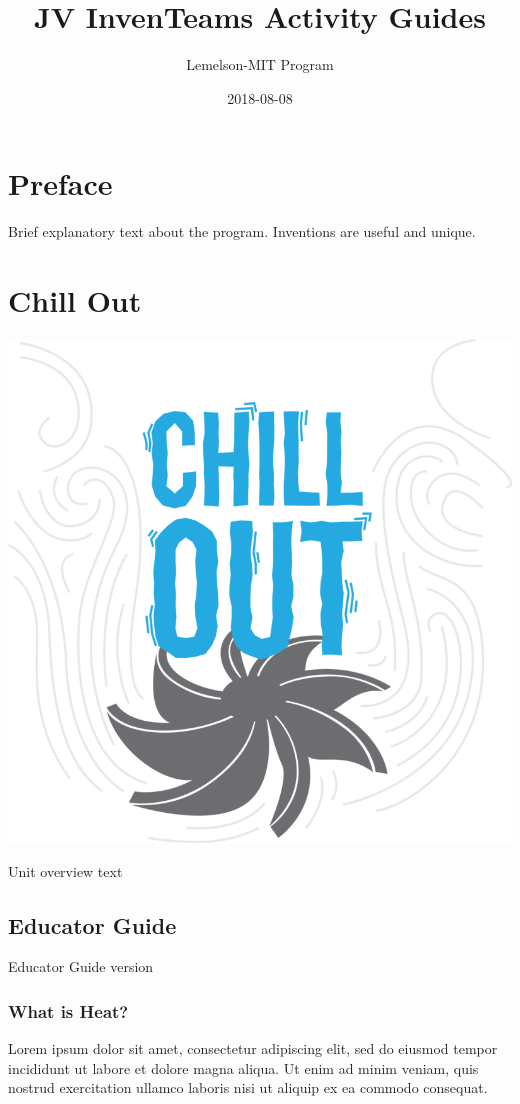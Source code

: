 \documentclass[]{book}
\title{JV InvenTeams Activity Guides}
\author{Lemelson-MIT Program}
\date{2018-08-08}
\begin{document}
\maketitle

{
\setcounter{tocdepth}{1}
\tableofcontents
}
\chapter*{Preface}\label{preface}

Brief explanatory text about the program. Inventions
\citep{inventingModAm} are useful and unique.

\chapter{Chill Out}\label{chill-out}

\begin{center}\includegraphics[width=0.5\linewidth]{img/chillOut} \end{center}

Unit overview text

\section{Educator Guide}\label{educator-guide}

Educator Guide version

\subsection*{What is Heat?}\label{what-is-heat}

Lorem ipsum dolor sit amet, consectetur adipiscing elit, sed do eiusmod
tempor incididunt ut labore et dolore magna aliqua. Ut enim ad minim
veniam, quis nostrud exercitation ullamco laboris nisi ut aliquip ex ea
commodo consequat.
\end{document}
